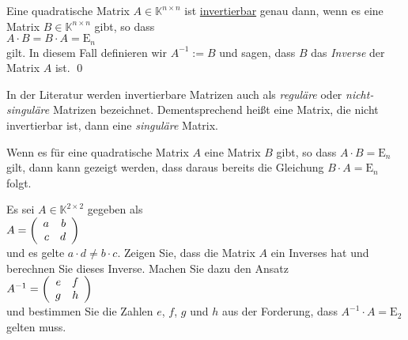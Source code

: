 \begin{Definition}
  Eine quadratische Matrix $A \in \mathbb{K}^{n \times n}$ ist \href{https://de.wikipedia.org/wiki/Reguläre_Matrix}{invertierbar} genau dann, wenn
  es eine Matrix $B \in \mathbb{K}^{n \times n}$ gibt, so dass 
  \\[0.2cm]
  \hspace*{1.3cm}
  $A \cdot B = B \cdot A = \mathrm{E}_n$
  \\[0.2cm]
  gilt.  In diesem Fall definieren wir $A^{-1} := B$ und sagen, dass $B$ das {\emph{\color{blue}Inverse}} der
  Matrix $A$ ist.  \qed
\end{Definition}

\remark
In der Literatur werden invertierbare Matrizen auch als \emph{\color{blue}regul\"are} oder \emph{\color{blue}nicht-singul\"are}
Matrizen bezeichnet.  Dementsprechend hei{\ss}t eine Matrix, die nicht invertierbar ist, dann eine
\emph{\color{blue}singul\"are} Matrix.

\remark
Wenn es f\"ur eine quadratische Matrix $A$ eine Matrix $B$ gibt, so dass $A \cdot B = \mathrm{E}_n$ gilt, dann kann gezeigt werden, dass daraus
bereits die Gleichung $B \cdot A = \mathrm{E}_n$ folgt. \eox

\exercise
Es sei $A \in \mathbb{K}^{2 \times 2}$ gegeben als
\\[0.2cm]
\hspace*{1.3cm}
$A = \left(
       \begin{array}[c]{rr}
         a & b \\
         c & d 
       \end{array}
     \right)
$
\\[0.2cm]
und es gelte $a \cdot d \not= b \cdot c$.  Zeigen Sie, dass die Matrix $A$ ein Inverses hat und
berechnen Sie dieses Inverse.
Machen Sie dazu den Ansatz
\\[0.2cm]
\hspace*{1.3cm}
$A^{-1}  = \left(
       \begin{array}[c]{rr}
         e & f \\
         g & h 
       \end{array}
     \right)
$
\\[0.2cm]
und bestimmen Sie die Zahlen $e$, $f$, $g$ und $h$ aus der Forderung, dass $A^{-1} \cdot A = \mathrm{E}_2$
gelten muss.
\eoxs

